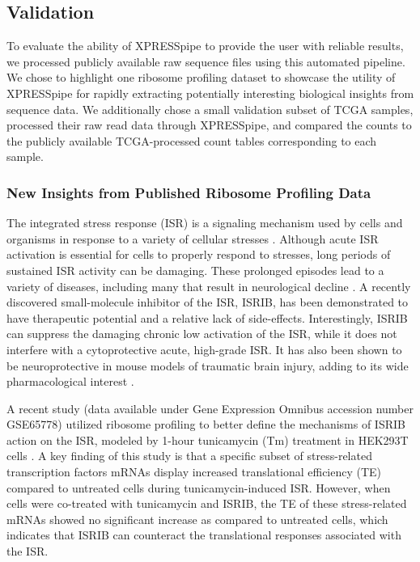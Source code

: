 \documentclass[10pt, oneside]{article}
\begin{document}
\subsection{Validation}
To evaluate the ability of XPRESSpipe to provide the user with reliable results, we processed publicly available raw sequence files using this automated pipeline. We chose to highlight one ribosome profiling dataset to showcase the utility of XPRESSpipe for rapidly extracting potentially interesting biological insights from sequence data. We additionally chose a small validation subset of TCGA samples, processed their raw read data through XPRESSpipe, and compared the counts to the publicly available TCGA-processed count tables corresponding to each sample.

\subsubsection{New Insights from Published Ribosome Profiling Data}
The integrated stress response (ISR) is a signaling mechanism used by cells and organisms in response to a variety of cellular stresses \cite{harding_isr}. Although acute ISR activation is essential for cells to properly respond to stresses, long periods of sustained ISR activity can be damaging. These prolonged episodes lead to a variety of diseases, including many that result in neurological decline \cite{isr_disease}. A recently discovered small-molecule inhibitor of the ISR, ISRIB, has been demonstrated to have therapeutic potential and a relative lack of side-effects. Interestingly, ISRIB can suppress the damaging chronic low activation of the ISR, while it does not interfere with a cytoprotective acute, high-grade ISR. It has also been shown to be neuroprotective in mouse models of traumatic brain injury, adding to its wide pharmacological interest \cite{isrib_activation, isrib_structure, isrib_riboseq, isrib_neuroprotective, isrib_neuroprotective2, isrib_neuroprotective3, isrib_neuroprotective4}. \par

A recent study (data available under Gene Expression Omnibus accession number GSE65778) utilized ribosome profiling to better define the mechanisms of ISRIB action on the ISR, modeled by 1-hour tunicamycin (Tm) treatment in HEK293T cells \cite{isrib_riboseq}. A key finding of this study is that a specific subset of stress-related transcription factors mRNAs display increased translational efficiency (TE) compared to untreated cells during tunicamycin-induced ISR. However, when cells were co-treated with tunicamycin and ISRIB, the TE of these stress-related mRNAs showed no significant increase as compared to untreated cells, which indicates that ISRIB can counteract the translational responses associated with the ISR. \par
\end{document}
